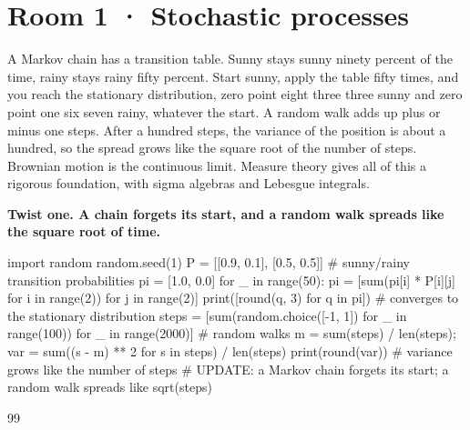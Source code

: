 \documentclass[11pt,a4paper]{report}
\begin{document}
\section*{Room 1 · Stochastic processes}
A Markov chain has a transition table. Sunny stays sunny ninety percent of the time, rainy stays rainy fifty percent. Start sunny, apply the table fifty times, and you reach the stationary distribution, zero point eight three three sunny and zero point one six seven rainy, whatever the start. A random walk adds up plus or minus one steps. After a hundred steps, the variance of the position is about a hundred, so the spread grows like the square root of the number of steps. Brownian motion is the continuous limit. Measure theory gives all of this a rigorous foundation, with sigma algebras and Lebesgue integrals.
\begin{tcolorbox}[colback=yellow!12,colframe=orange!70!black,boxrule=0.4pt,left=4pt,right=4pt,top=2pt,bottom=2pt]\textbf{Twist one. A chain forgets its start, and a random walk spreads like the square root of time.}\end{tcolorbox}
\begin{Code}
import random
random.seed(1)
P = [[0.9, 0.1], [0.5, 0.5]]                # sunny/rainy transition probabilities
pi = [1.0, 0.0]
for _ in range(50): pi = [sum(pi[i] * P[i][j] for i in range(2)) for j in range(2)]
print([round(q, 3) for q in pi])            # converges to the stationary distribution
steps = [sum(random.choice([-1, 1]) for _ in range(100)) for _ in range(2000)]   # random walks
m = sum(steps) / len(steps); var = sum((s - m) ** 2 for s in steps) / len(steps)
print(round(var))                           # variance grows like the number of steps
# UPDATE: a Markov chain forgets its start; a random walk spreads like sqrt(steps)
\end{Code}
\begin{Out}
[0.833, 0.167]
99
\end{Out}
\end{document}
